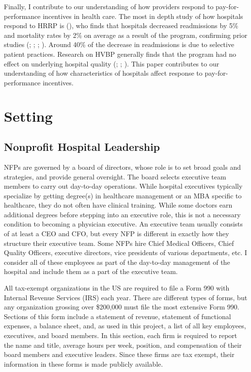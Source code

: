 \documentclass[12pt]{article}
\begin{document}
    Finally, I contribute to our understanding of how providers respond to pay-for-performance incentives in health care. The most in depth study of how hospitals respond to HRRP is \citeauthor{gupta2021impacts} (\citeyear{gupta2021impacts}), who finds that hospitals decreased readmissions by 5\% and mortality rates by 2\% on average as a result of the program, confirming prior studies (\cite{mellor2017does}; \cite{ziedan2018essays}; \cite{ody2019decreases}; \cite{gupta2021impacts}). Around 40\% of the decrease in readmissions is due to selective patient practices. Research on HVBP generally finds that the program had no effect on underlying hospital quality (\cite{us2015hospital}; \cite{norton2018moneyball}; \cite{friedson2019so}). This paper contributes to our understanding of how characteristics of hospitals affect response to pay-for-performance incentives. 

    

    \section{Setting}

    \subsection{Nonprofit Hospital Leadership}

    NFPs are governed by a board of directors, whose role is to set broad goals and strategies, and provide general oversight. The board selects executive team members to carry out day-to-day operations. While hospital executives typically specialize by getting degree(s) in healthcare management or an MBA specific to healthcare, they do not often have clinical training. While some doctors earn additional degrees before stepping into an executive role, this is not a necessary condition to becoming a physician executive. An executive team usually consists of at least a CEO and CFO, but every NFP is different in exactly how they structure their executive team. Some NFPs hire Chief Medical Officers, Chief Quality Officers, executive directors, vice presidents of various departments, etc. I consider all of these employees as part of the day-to-day management of the hospital and include them as a part of the executive team. 

    All tax-exempt organizations in the US are required to file a Form 990 with Internal Revenue Services (IRS) each year. There are different types of forms, but any organization grossing over \$200,000 must file the most extensive Form 990. Sections of this form include a statement of revenue, statement of functional expenses, a balance sheet, and, as used in this project, a list of all key employees, executives, and board members. In this section, each firm is required to report the name and title, average hours per week, position, and compensation of their board members and executive leaders. Since these firms are tax exempt, their information in these forms is made publicly available.  
\end{document}
